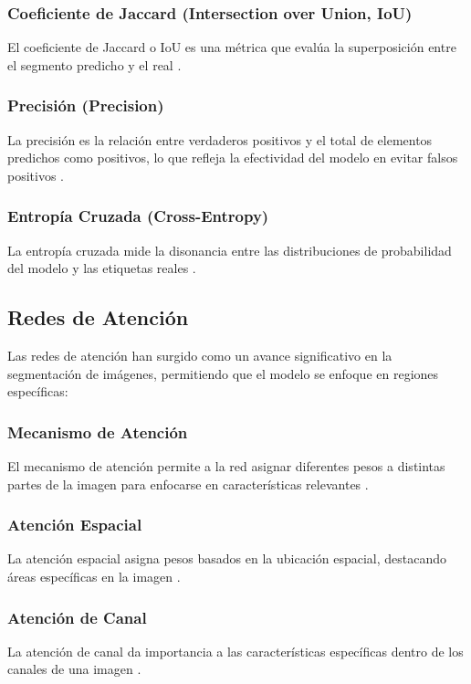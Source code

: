\subsubsection{Coeficiente de Jaccard (Intersection over Union, IoU)}
El coeficiente de Jaccard o IoU es una métrica que evalúa la superposición entre el segmento predicho y el real \cite{autor2021iou}.

\subsubsection{Precisión (Precision)}
La precisión es la relación entre verdaderos positivos y el total de elementos predichos como positivos, lo que refleja la efectividad del modelo en evitar falsos positivos \cite{autor2019precision}.

\subsubsection{Entropía Cruzada (Cross-Entropy)}
La entropía cruzada mide la disonancia entre las distribuciones de probabilidad del modelo y las etiquetas reales \cite{autor2022crossentropy}.

\subsection{Redes de Atención}
Las redes de atención han surgido como un avance significativo en la segmentación de imágenes, permitiendo que el modelo se enfoque en regiones específicas:

\subsubsection{Mecanismo de Atención}
El mecanismo de atención permite a la red asignar diferentes pesos a distintas partes de la imagen para enfocarse en características relevantes \cite{autor2021atencion}.

\subsubsection{Atención Espacial}
La atención espacial asigna pesos basados en la ubicación espacial, destacando áreas específicas en la imagen \cite{autor2020spa}.

\subsubsection{Atención de Canal}
La atención de canal da importancia a las características específicas dentro de los canales de una imagen \cite{autor2019canal}.

